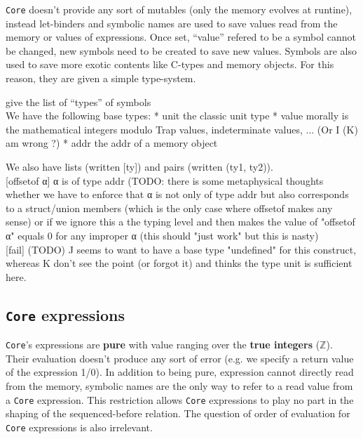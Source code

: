 \documentclass[12pt, a4paper]{article}
\newcommand{\TODO}[1]{{\color{red} #1}}
\newcommand{\Z}{\ensuremath{\mathbb{Z}}}
\newcommand{\core}{\texttt{Core}}
\begin{document}
\core{} doesn't provide any sort of mutables (only the memory evolves at runtine), instead let-binders and symbolic names are
used to save values read from the memory or values of expressions. Once set, ``value'' refered to be a symbol cannot be changed,
new symbols need to be created to save new values. Symbols are also used to save more exotic contents like C-types and
memory objects. For this reason, they are given a simple type-system.

\TODO{give the list of ``types'' of symbols\\
  We have the following base types:
    * unit    the classic unit type
    * value   morally is the mathematical integers modulo Trap values,
              indeterminate values, ... (Or I (K) am wrong ?)
    * addr    the addr of a memory object
  
  We also have lists (written [ty]) and pairs (written (ty1, ty2)).\\

    [offsetof α]  α is of type addr (TODO: there is some metaphysical thoughts
                  whether we have to enforce that α is not only of type addr but
                  also corresponds to a struct/union members (which is the only
                  case where offsetof makes any sense) or if we ignore this a
                  the typing level and then makes the value of "offsetof α"
                  equals 0 for any improper α (this should "just work" but this
                  is nasty)\\

    [fail]                  (TODO) J seems to want to have a base type
                            "undefined" for this construct, whereas K don't see
                            the point (or forgot it) and thinks the type unit is
                            sufficient here.

}



\subsection{\core{} expressions}
\core{}'s expressions are {\bf pure} with value ranging over the {\bf true integers} ($\Z$).
Their evaluation doesn't produce any sort of error (e.g. we specify a return value of the expression 1/0).
In addition to being pure, expression cannot directly read from the memory, symbolic names are the
only way to refer to a read value from a \core{} expression.
This restriction allows \core{} expressions to play no part in the shaping of the sequenced-before relation.
The question of order of evaluation for \core{} expressions is also irrelevant.
\end{document}
